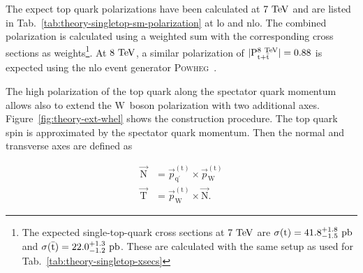 The expect top quark polarizations have been calculated at $7~\mathrm{TeV}$ and are listed in Tab.~\ref{tab:theory-singletop-sm-polarization} at \gls{lo} and \gls{nlo}. The combined polarization is calculated using a weighted sum with the corresponding cross sections as weights\footnote{The expected single-top-quark cross sections at $7~\mathrm{TeV}$ are $\sigma(\mathrm{t})=41.8^{+1.8}_{-1.5}~\mathrm{pb}$ and $\sigma(\bar{\mathrm{t}})=22.0^{+1.3}_{-1.2}~\mathrm{pb}$. These are calculated with the same setup as used for Tab.~\ref{tab:theory-singletop-xsecs}}. At $8~\mathrm{TeV}$, a similar polarization of $|\mathrm{P}_{\mathrm{t}+\bar{\mathrm{t}}}^\mathrm{8~\mathrm{TeV}}|=0.88$ is expected using the \gls{nlo} event generator \textsc{Powheg}~\cite{Khachatryan:2015dzz}.


The high polarization of the top quark along the spectator quark momentum allows also to extend the $\mathrm{W}$~boson polarization with two additional axes. Figure~\ref{fig:theory-ext-whel} shows the construction procedure. The top quark spin is approximated by the spectator quark momentum. Then the normal and transverse axes are defined as 

\begin{align}
\vec{\mathrm{N}}&=\vec{p}_{\mathrm{q}^\prime}^{\mathrm{(t)}}\times\vec{p}_{\mathrm{W}}^{\mathrm{(t)}} \\
\vec{\mathrm{T}}&=\vec{p}_{\mathrm{W}}^{\mathrm{(t)}}\times \vec{\mathrm{N}}.
\end{align}

